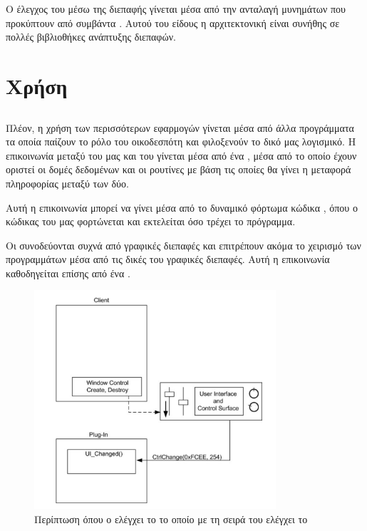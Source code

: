 \documentclass[12pt]{extarticle}
\begin{document}
Ο έλεγχος του  μέσω της διεπαφής γίνεται μέσα από την ανταλαγή μυνημάτων 
που προκύπτουν από συμβάντα  \cite{EventsArchWiki}. Αυτού του είδους η αρχιτεκτονική 
είναι συνήθης σε πολλές βιβλιοθήκες ανάπτυξης διεπαφών.

\section{Χρήση}

\subsection{}

Πλέον, η χρήση των περισσότερων εφαρμογών  γίνεται μέσα 
από άλλα προγράμματα τα οποία παίζουν το ρόλο του οικοδεσπότη 
και φιλοξενούν το δικό μας λογισμικό. Η επικοινωνία μεταξύ 
του  μας και του  γίνεται μέσα από 
ένα , μέσα από το οποίο έχουν οριστεί οι δομές δεδομένων 
και οι ρουτίνες με βάση τις οποίες θα γίνει η μεταφορά πληροφορίας 
μεταξύ των δύο. 


Αυτή η επικοινωνία μπορεί να γίνει μέσα από το δυναμικό 
φόρτωμα κώδικα \cite{DynamicLoadWiki}, όπου 
ο κώδικας του  μας φορτώνεται και εκτελείται όσο τρέχει
το  πρόγραμμα. \cite{DesignPlugins}

Οι  συνοδεύονται συχνά από γραφικές διεπαφές και επιτρέπουν ακόμα 
το χειρισμό των  προγραμμάτων μέσα από τις δικές του γραφικές 
διεπαφές. Αυτή η επικοινωνία καθοδηγείται επίσης από ένα . 

\begin{figure}[!htb]
    \centering
    \includegraphics[width=0.8\textwidth]{./assets/plugin_client.png}
    \caption{Περίπτωση όπου ο  ελέγχει το  το οποίο με τη σειρά του ελέγχει το }
    \label{fig:}
\end{figure}
\end{document}
